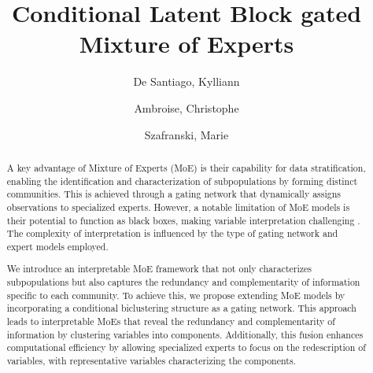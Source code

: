 \documentclass[authoryear,preprint,review,12pt]{elsarticle}
\DeclareMathOperator{\1}{\mathds{1}}
\begin{document}
\begin{frontmatter}



\title{Conditional Latent Block gated Mixture of Experts}

\author[affilation1]{De Santiago, Kylliann} %
\author[affilation1]{Ambroise, Christophe} %
\author[affilation1]{Szafranski, Marie} %

    

\begin{abstract}
A key advantage of Mixture of Experts (MoE) is their capability for data stratification, enabling the identification and characterization of subpopulations by forming distinct communities. This is achieved through a gating network that dynamically assigns observations to specialized experts. However, a notable limitation of MoE models is their potential to function as black boxes, making variable interpretation challenging . The complexity of interpretation is influenced by the type of gating network and expert models employed.

We introduce an interpretable MoE framework that not only characterizes subpopulations but also captures the redundancy and complementarity of information specific to each community. To achieve this, we propose extending MoE models by incorporating a conditional biclustering structure as a gating network. This approach leads to interpretable MoEs that reveal the redundancy and complementarity of information by clustering variables into components. Additionally, this fusion enhances computational efficiency by allowing specialized experts to focus on the redescription of variables, with representative variables characterizing the components.
\end{abstract}


\end{frontmatter}
\end{document}
